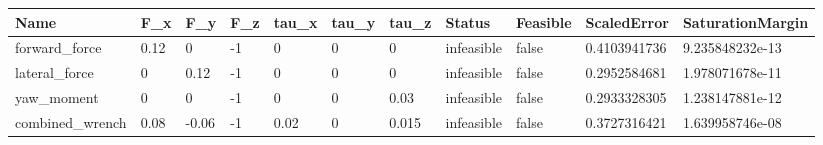 \begin{tabular}{@{}lllllllllll@{}}
\toprule
Name & F\_x & F\_y & F\_z & tau\_x & tau\_y & tau\_z & Status & Feasible & ScaledError & SaturationMargin \\
\midrule
forward\_force & 0.12 & 0 & -1 & 0 & 0 & 0 & infeasible & false & 0.4103941736 & 9.235848232e-13 \\
lateral\_force & 0 & 0.12 & -1 & 0 & 0 & 0 & infeasible & false & 0.2952584681 & 1.978071678e-11 \\
yaw\_moment & 0 & 0 & -1 & 0 & 0 & 0.03 & infeasible & false & 0.2933328305 & 1.238147881e-12 \\
combined\_wrench & 0.08 & -0.06 & -1 & 0.02 & 0 & 0.015 & infeasible & false & 0.3727316421 & 1.639958746e-08 \\
\bottomrule
\end{tabular}
